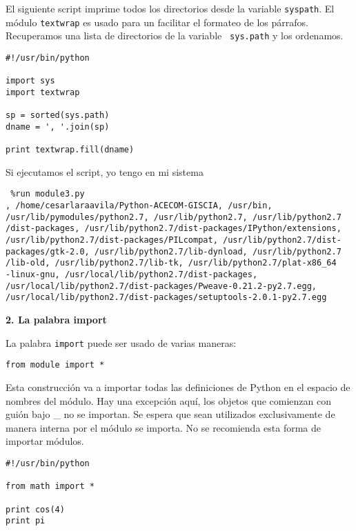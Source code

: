 \documentclass[twoside,10.5pt]{article}%
\begin{document}
El siguiente script imprime todos los directorios desde la variable \texttt{syspath}. El m\'odulo \texttt{textwrap} es usado para un facilitar  el formateo de los p\'arrafos. Recuperamos una lista de directorios de la variable \texttt{ sys.path}  y  los ordenamos.

\begin{verbatim}
#!/usr/bin/python

import sys
import textwrap

sp = sorted(sys.path)
dname = ', '.join(sp)

print textwrap.fill(dname)
\end{verbatim}


Si ejecutamos el script, yo tengo en mi sistema 

\begin{verbatim}
 %run module3.py
, /home/cesarlaraavila/Python-ACECOM-GISCIA, /usr/bin,
/usr/lib/pymodules/python2.7, /usr/lib/python2.7, /usr/lib/python2.7
/dist-packages, /usr/lib/python2.7/dist-packages/IPython/extensions,
/usr/lib/python2.7/dist-packages/PILcompat, /usr/lib/python2.7/dist-
packages/gtk-2.0, /usr/lib/python2.7/lib-dynload, /usr/lib/python2.7
/lib-old, /usr/lib/python2.7/lib-tk, /usr/lib/python2.7/plat-x86_64
-linux-gnu, /usr/local/lib/python2.7/dist-packages,
/usr/local/lib/python2.7/dist-packages/Pweave-0.21.2-py2.7.egg,
/usr/local/lib/python2.7/dist-packages/setuptools-2.0.1-py2.7.egg
\end{verbatim}

\vspace{0.3cm}

\textbf{2. La palabra import}


La palabra \texttt{import} puede ser usado de varias maneras:

\begin{verbatim}
from module import *
\end{verbatim} 


Esta construcción va a importar todas las definiciones de Python en el espacio de nombres del m\'odulo. Hay una excepci\'on aqu\'i, los objetos que comienzan con guión bajo \_ no se importan. Se espera que sean utilizados exclusivamente de manera interna por el m\'odulo se importa. No se recomienda esta forma de importar m\'odulos.

\begin{verbatim}
#!/usr/bin/python

from math import *

print cos(4)
print pi
\end{verbatim}
\end{document}
